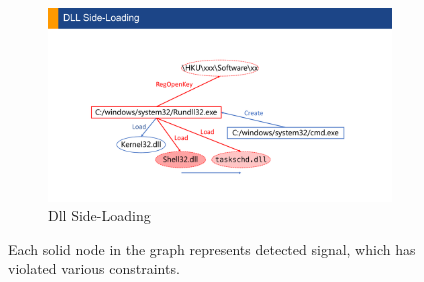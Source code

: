 \begin{figure}
\begin{minipage}[b]{0.65\textwidth}
\begin{subfigure}{.5\textwidth}
  \end{subfigure}
  \hfill
  \begin{subfigure}{.5\textwidth}
      \includegraphics[width=\textwidth]{figs/Dll Side-Loading.pdf}
      \caption{Dll Side-Loading}
      \label{fig:side-load}
  \end{subfigure}

  \centering
 \caption{Each solid node in the graph represents detected signal, which has violated various constraints.}
\end{minipage}
\hfill
\begin{minipage}[b]{0.34\textwidth} 


\end{minipage}
\end{figure}
